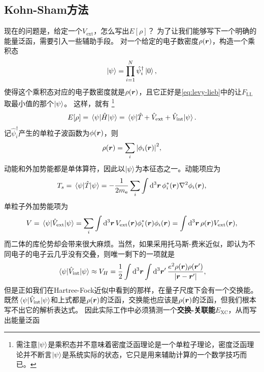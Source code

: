 \documentclass[hyperref, UTF8, a4paper]{ctexart}
\begin{document}
\subsection{Kohn-Sham方法}

现在的问题是，给定一个$V_\text{ext}$，怎么写出$E[\rho]$？
为了让我们能够写下一个明确的能量泛函，需要引入一些辅助手段。
对一个给定的电子数密度$\rho(\vb*{r})$，构造一个乘积态
\begin{equation}
    \ket{\psi} = \prod_{i=1}^N \hat{\psi}^\dagger_i \ket{0},
\end{equation}
使得这个乘积态对应的电子数密度就是$\rho(\vb*{r})$，且它正好是\eqref{eq:levy-lieb}中的让$F_\text{LL}$取最小值的那个$\ket{\psi}$。
这样，就有%
\footnote{需注意$\ket{\psi}$是乘积态并不意味着密度泛函理论是一个单粒子理论，密度泛函理论并不断言$\ket{\psi}$是系统实际的状态，它只是用来辅助计算的一个数学技巧而已。}%
\begin{equation}
    E[\rho] = \mel{\psi}{\hat{H}}{\psi} = \mel{\psi}{\hat{T} + \hat{V}_\text{ext} + \hat{V}_\text{int}}{\psi}.
\end{equation}
记$\hat{\psi}_i^\dagger$产生的单粒子波函数为$\phi(\vb*{r})$，则
\begin{equation}
    \rho(\vb*{r}) = \sum_i \abs{\phi_i(\vb*{r})}^2,
    \label{eq:kohn-sham-density}
\end{equation}
动能和外加势能都是单体算符，因此以$\ket{\psi}$为本征态之一。动能项应为
\begin{equation}
    T_s = \mel{\psi}{\hat{T}}{\psi} = - \frac{1}{2m_\text{e}} \sum_i \int \dd[3]{\vb*{r}} \phi_i^*(\vb*{r}) \laplacian \phi_i(\vb*{r}),
\end{equation}
单粒子外加势能项为
\begin{equation}
    V = \mel{\psi}{\hat{V}_\text{ext}}{\psi} = \sum_i \int \dd[3]{\vb*{r}} V_{\text{ext}}(\vb*{r}) \phi_i^*(\vb*{r}) \phi_i(\vb*{r}) = \int \dd[3]{\vb*{r}} \rho(\vb*{r}) V_\text{ext}(\vb*{r}),
\end{equation}
而二体的库伦势却会带来很大麻烦。当然，如果采用托马斯-费米近似，即认为不同电子的电子云几乎没有交叠，则唯一剩下的一项就是
\[
    \mel{\psi}{\hat{V}_\text{int}}{\psi} \approx V_H = \frac{1}{2} \int \dd[3]{\vb*{r}} \int \dd[3]{\vb*{r}'} \frac{e^2 \rho(\vb*{r}) \rho(\vb*{r}')}{\abs{\vb*{r} - \vb*{r}'}},
\]
但是正如我们在Hartree-Fock近似中看到的那样，在量子尺度下会有一个交换能。既然$\mel{\psi}{\hat{V}_\text{int}}{\psi}$和上式都是$\rho(\vb*{r})$的泛函，交换能也应该是$\rho(\vb*{r})$的泛函，但我们根本写不出它的解析表达式。
因此实际工作中必须猜测一个\textbf{交换-关联能}$E_\text{XC}$，从而写出能量泛函
\end{document}
